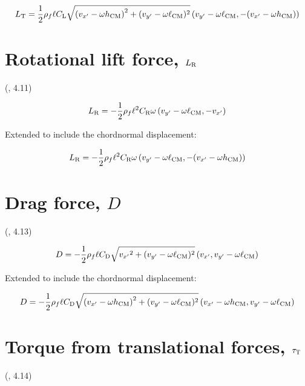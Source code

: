 \documentclass[draft]{jfm} %
\begin{document}
\begin{equation}
L_{\textnormal{T}} = \frac{1}{2}\rho_f\ell C_{\textnormal{L}}\sqrt{\left ( {v_{x'}}- \omega h_{\textup{CM}} \right )^2+(v_{y'}- \omega \ell_{\textup{CM}})^2}\left ( v_{y'}- \omega\ell_{\textup{CM}}, -({v_{x'}}- \omega h_{\textup{CM}}) \right ) 
\end{equation}

\section{Rotational lift force, $L_{\textnormal{R}}$} 
(\cite{Li2022model}, 4.11)
\label{sec:lr}

\begin{equation}
 L_{\textnormal{R}} = -\frac{1}{2}\rho_f\ell^2 C_{\textnormal{R}}\omega\left ( v_{y'}- \omega\ell_{\textup{CM}}, -{v_{x'}} \right )
\end{equation}

Extended to include the chordnormal displacement:

\begin{equation}
 L_{\textnormal{R}} = -\frac{1}{2}\rho_f\ell^2 C_{\textnormal{R}}\omega\left ( v_{y'}- \omega\ell_{\textup{CM}}, -({v_{x'}}- \omega h_{\textup{CM}} )\right )
\end{equation}

\section{Drag force, $D$} \label{sec:d}
(\cite{Li2022model}, 4.13)

\begin{equation}
D = -\frac{1}{2}\rho_f\ell C_{\textnormal{D}} \sqrt{{v_{x'}}^2+(v_{y'}- \omega \ell_{\textup{CM}})^2}\left ( v_{x'},v_{y'}- \omega\ell_{\textup{CM}} \right )
\end{equation}

Extended to include the chordnormal displacement:

\begin{equation}
D = -\frac{1}{2}\rho_f\ell C_{\textnormal{D}} \sqrt{\left ( {v_{x'}}- \omega h_{\textup{CM}} \right )^2+(v_{y'}- \omega \ell_{\textup{CM}})^2}\left ({v_{x'}}- \omega h_{\textup{CM}} ,v_{y'}- \omega\ell_{\textup{CM}} \right ) 
\end{equation}

\section{Torque from translational forces, $\tau_\textnormal{T}$} \label{sec:t1}
(\cite{Li2022model}, 4.14)
\end{document}
